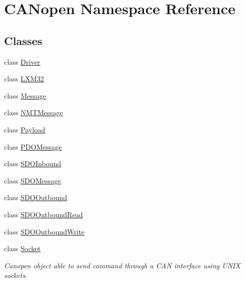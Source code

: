 \hypertarget{namespace_c_a_nopen}{}\section{C\+A\+Nopen Namespace Reference}
\label{namespace_c_a_nopen}
\subsection*{Classes}
\begin{DoxyCompactItemize}
\item 
class \hyperlink{class_c_a_nopen_1_1_driver}{Driver}
\item 
class \hyperlink{class_c_a_nopen_1_1_l_x_m32}{L\+X\+M32}
\item 
class \hyperlink{class_c_a_nopen_1_1_message}{Message}
\item 
class \hyperlink{class_c_a_nopen_1_1_n_m_t_message}{N\+M\+T\+Message}
\item 
class \hyperlink{class_c_a_nopen_1_1_payload}{Payload}
\item 
class \hyperlink{class_c_a_nopen_1_1_p_d_o_message}{P\+D\+O\+Message}
\item 
class \hyperlink{class_c_a_nopen_1_1_s_d_o_inbound}{S\+D\+O\+Inbound}
\item 
class \hyperlink{class_c_a_nopen_1_1_s_d_o_message}{S\+D\+O\+Message}
\item 
class \hyperlink{class_c_a_nopen_1_1_s_d_o_outbound}{S\+D\+O\+Outbound}
\item 
class \hyperlink{class_c_a_nopen_1_1_s_d_o_outbound_read}{S\+D\+O\+Outbound\+Read}
\item 
class \hyperlink{class_c_a_nopen_1_1_s_d_o_outbound_write}{S\+D\+O\+Outbound\+Write}
\item 
class \hyperlink{class_c_a_nopen_1_1_socket}{Socket}
\begin{DoxyCompactList}\small\item\em Canopen object able to send command through a C\+AN interface using U\+N\+IX sockets. \end{DoxyCompactList}\end{DoxyCompactItemize}
